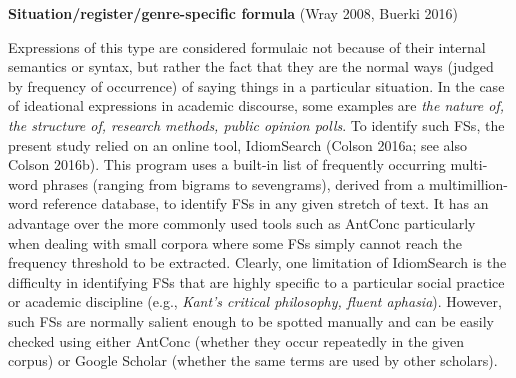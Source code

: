 \begin{styleStandard}
\textbf{Situation/register/genre-specific formula} (Wray 2008, Buerki 2016)
\end{styleStandard}

\begin{styleStandard}
Expressions of this type are considered formulaic not because of their internal semantics or syntax, but rather the fact that they are the normal ways (judged by frequency of occurrence) of saying things in a particular situation. In the case of ideational expressions in academic discourse, some examples are \textit{the nature of, the structure of, research methods, public opinion polls}. To identify such FSs, the present study relied on an online tool, IdiomSearch (Colson 2016a; see also Colson 2016b). This program uses a built-in list of frequently occurring multi-word phrases (ranging from bigrams to sevengrams), derived from a multimillion-word reference database, to identify FSs in any given stretch of text. It has an advantage over the more commonly used tools such as AntConc particularly when dealing with small corpora where some FSs simply cannot reach the frequency threshold to be extracted. Clearly, one limitation of IdiomSearch is the difficulty in identifying FSs that are highly specific to a particular social practice or academic discipline (e.g., \textit{Kant’s critical philosophy, fluent aphasia}). However, such FSs are normally salient enough to be spotted manually and can be easily checked using either AntConc (whether they occur repeatedly in the given corpus) or Google Scholar (whether the same terms are used by other scholars).
\end{styleStandard}

